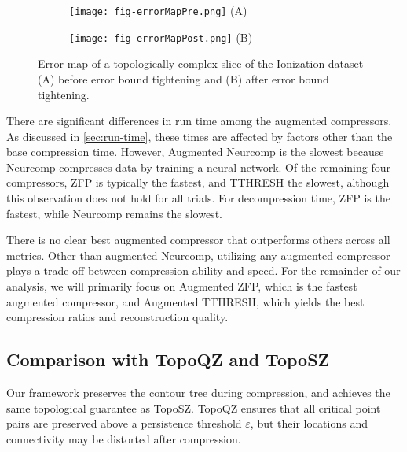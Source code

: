 \begin{figure}[!t]
    \begin{subfigure}[b]{0.06\linewidth}
    \end{subfigure}
    \hfill
    \begin{subfigure}[b]{0.46\linewidth}
    \centering
        \texttt{[image: fig-errorMapPre.png]}
        (A)
    \end{subfigure}
    \hfill
    \begin{subfigure}[b]{0.46\linewidth}
    \centering
        \texttt{[image: fig-errorMapPost.png]}
        (B)
    \end{subfigure}
    \vspace{-5mm}
    \caption{Error map of a topologically complex slice of the Ionization dataset (A) before error bound tightening and (B) after error bound tightening.}
    \label{fig:errorMap}
    \vspace{-8mm}
\end{figure}

There are significant differences in run time among the augmented compressors.
As discussed in \cref{sec:run-time}, these times are affected by factors other than the base compression time. However, Augmented Neurcomp is the slowest because Neurcomp compresses data by training a neural network.  
Of the remaining four compressors, ZFP is typically the fastest, and TTHRESH the slowest, although this observation does not hold for all trials. For decompression time, ZFP is the fastest, while Neurcomp remains the slowest.

There is no clear best augmented compressor that outperforms others across all metrics. Other than augmented Neurcomp, utilizing any augmented compressor plays a trade off between compression ability and speed. For the remainder of our analysis, we will primarily focus on Augmented ZFP, which is the fastest augmented compressor, and Augmented TTHRESH, which yields the best compression ratios and reconstruction quality.

\subsection{Comparison with TopoQZ and TopoSZ}
\label{sec:compare-topology}

Our framework preserves the contour tree during compression, and achieves the same topological guarantee as TopoSZ. TopoQZ ensures that all critical point pairs are preserved above a persistence threshold $\varepsilon$, but their locations and connectivity may be distorted after compression.

